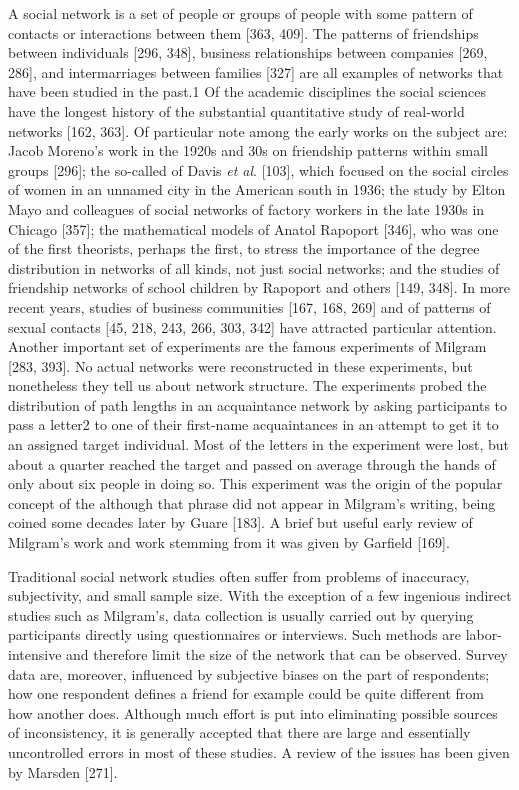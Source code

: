       A social network is a set of people or groups of people with some pattern of contacts or interactions between them [363, 409]. The patterns of friendships between individuals [296, 348], business relationships between companies [269, 286], and intermarriages between families [327] are all examples of networks that have been studied in the past.1 Of the academic disciplines the social sciences have the longest history of the substantial quantitative study of real-world networks [162, 363]. Of particular note among the early works on the subject are: Jacob Moreno's work in the 1920s and 30s on friendship patterns within small groups [296]; the so-called  of Davis \textit{et al}. [103], which focused on the social circles of women in an unnamed city in the American south in 1936; the study by Elton Mayo and colleagues of social networks of factory workers in the late 1930s in Chicago [357]; the mathematical models of Anatol Rapoport [346], who was one of the first theorists, perhaps the first, to stress the importance of the degree distribution in networks of all kinds, not just social networks; and the studies of friendship networks of school children by Rapoport and others [149, 348]. In more recent years, studies of business communities [167, 168, 269] and of patterns of sexual contacts [45, 218, 243, 266, 303, 342] have attracted particular attention.
Another important set of experiments are the famous  experiments of Milgram [283, 393]. No actual networks were reconstructed in these experiments, but nonetheless they tell us about network structure. The experiments probed the distribution of path lengths in an acquaintance network by asking participants to pass a letter2 to one of their first-name acquaintances in an attempt to get it to an assigned target individual. Most of the letters in the experiment were lost, but about a quarter reached the target and passed on average through the hands of only about six people in doing so. This experiment was the origin of the popular concept of the  although that phrase did not appear in Milgram's writing, being coined some decades later by Guare [183]. A brief but useful early review of Milgram’s work and work stemming from it was given by Garfield [169].
      
      Traditional social network studies often suffer from problems of inaccuracy, subjectivity, and small sample size. With the exception of a few ingenious indirect studies such as Milgram’s, data collection is usually carried out by querying participants directly using questionnaires or interviews. Such methods are labor-intensive and therefore limit the size of the network that can be observed. Survey data are, moreover, influenced by subjective biases on the part of respondents; how one respondent defines a friend for example could be quite different from how another does. Although much effort is put into eliminating possible sources of inconsistency, it is generally accepted that there are large and essentially uncontrolled errors in most of these studies. A review of the issues has been given by Marsden [271].
      
